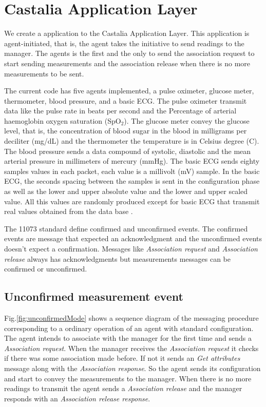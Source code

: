 \section{Castalia Application Layer}\label{castaliaapplayer}

We create a application to the Castalia Application Layer. This application is agent-initiated, that is, the agent takes the initiative to send readings to the manager. The agents is the first and the only to send the association request to start sending measurements and the association release when there is no more measurements to be sent.

The current code has five agents implemented, a pulse oximeter, glucose meter, thermometer, blood pressure, and a basic ECG. The pulse oximeter transmit data like the pulse rate in beats per second and the Percentage of arterial haemoglobin oxygen saturation (SpO$_2$). The glucose meter convey the glucose level, that is, the concentration of blood sugar in the blood in milligrams per deciliter (mg\//dL) and the thermometer the temperature is in Celsius degree (\textdegree C). The blood pressure sends a data compound of systolic, diastolic and the mean arterial pressure in millimeters of mercury (mmHg). The basic ECG sends eighty samples values in each packet, each value is a millivolt (mV) sample. In the basic ECG, the seconds spacing between the samples is sent in the configuration phase as well as the lower and upper absolute value and the lower and upper scaled value. All this values are randomly produced except for basic ECG that transmit real values obtained from the data base \cite{b2}. 

The 11073 standard define confirmed and unconfirmed events. The confirmed events are message that expected an acknowledgment and the unconfirmed events doesn't expect a confirmation. Messages like \textit{Association request} and \textit{Association release} always has acknowledgments but measurements messages can be confirmed or unconfirmed. %

\subsection{Unconfirmed measurement event}\label{sec:UnconfirmedMeasurementEvent}

Fig.\ref{fig:unconfirmedMode} shows a sequence diagram of the messaging procedure corresponding to a ordinary operation of an agent with standard configuration. The agent intends to associate with the manager for the first time and sends a \textit{Association request}. When the manager receives the \textit{Association request} it checks if there was some association made before. If not it sends an \textit{Get attributes} message along with the \textit{Association response}. So the agent sends its configuration and start to convey the measurements to the manager. When there is no more readings to transmit the agent sends a \textit{Association release} and the manager responds with an \textit{Association release response}.

